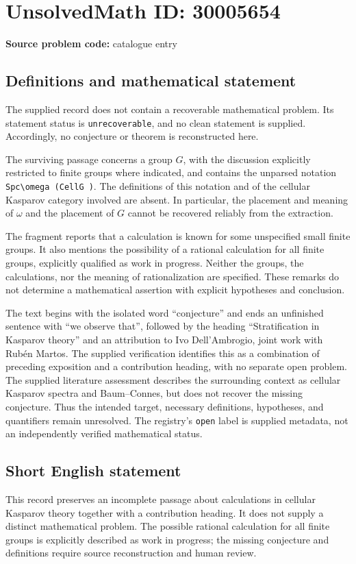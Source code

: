 \documentclass[11pt]{article}
\begin{document}
\section*{UnsolvedMath ID: 30005654}
\textbf{Source problem code:} catalogue entry
\subsection{Definitions and mathematical statement}
The supplied record does not contain a recoverable mathematical problem. Its statement status is \texttt{unrecoverable}, and no clean statement is supplied. Accordingly, no conjecture or theorem is reconstructed here.

The surviving passage concerns a group $G$, with the discussion explicitly restricted to finite groups where indicated, and contains the unparsed notation \texttt{Spc\textbackslash omega (CellG )}. The definitions of this notation and of the cellular Kasparov category involved are absent. In particular, the placement and meaning of $\omega$ and the placement of $G$ cannot be recovered reliably from the extraction.

The fragment reports that a calculation is known for some unspecified small finite groups. It also mentions the possibility of a rational calculation for all finite groups, explicitly qualified as work in progress. Neither the groups, the calculations, nor the meaning of rationalization are specified. These remarks do not determine a mathematical assertion with explicit hypotheses and conclusion.

The text begins with the isolated word ``conjecture'' and ends an unfinished sentence with ``we observe that'', followed by the heading ``Stratification in Kasparov theory'' and an attribution to Ivo Dell'Ambrogio, joint work with Rub\'en Martos. The supplied verification identifies this as a combination of preceding exposition and a contribution heading, with no separate open problem. The supplied literature assessment describes the surrounding context as cellular Kasparov spectra and Baum--Connes, but does not recover the missing conjecture. Thus the intended target, necessary definitions, hypotheses, and quantifiers remain unresolved. The registry's \texttt{open} label is supplied metadata, not an independently verified mathematical status.
\subsection{Short English statement}
This record preserves an incomplete passage about calculations in cellular Kasparov theory together with a contribution heading. It does not supply a distinct mathematical problem. The possible rational calculation for all finite groups is explicitly described as work in progress; the missing conjecture and definitions require source reconstruction and human review.
\end{document}
